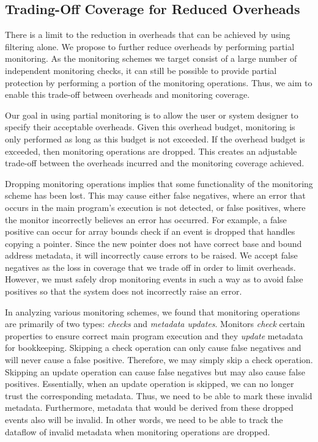 \subsection{Trading-Off Coverage for Reduced Overheads}
\label{sec:optimizations.drop}

There is a limit to the reduction in overheads that can be achieved by using
filtering alone. We propose to further reduce overheads
by performing partial monitoring. As the
monitoring schemes we target consist of a large number of independent
monitoring checks, it can still be possible to provide partial protection by
performing a portion of the monitoring operations. Thus, we aim to enable this
trade-off between overheads and monitoring coverage.

Our goal in using partial monitoring is to allow the user or system designer to
specify their acceptable overheads. Given this overhead budget, monitoring is
only performed as long as this budget is not exceeded. If the overhead budget
is exceeded, then monitoring operations are dropped. This creates an adjustable
trade-off between the overheads incurred and the monitoring coverage achieved.

Dropping monitoring operations implies that some functionality of the
monitoring scheme has been lost.  This may cause either false negatives, where
an error that occurs in the main program's execution is not detected, or false
positives, where the monitor incorrectly believes an error has occurred.  For
example, a false positive can occur for array bounds check if an event is
dropped that handles copying a pointer. Since the new pointer does not have
correct base and bound address metadata, it will incorrectly cause errors to be
raised.  We accept false negatives as the
loss in coverage that we trade off in order to limit overheads.  However, we
must safely drop monitoring events in such a way as to avoid false positives so
that the system does not incorrectly raise an error.

In analyzing various monitoring schemes, we found that monitoring operations
are primarily of two types: \emph{checks} and \emph{metadata updates}. Monitors
\emph{check} certain properties to ensure correct main program execution and
they \emph{update} metadata for bookkeeping. Skipping a check operation can
only cause false negatives and will never cause a false positive. Therefore, we
may simply skip a check operation. Skipping an update operation can cause false
negatives but may also cause false positives. Essentially, when an update
operation is skipped, we can no longer trust the corresponding metadata. Thus,
we need to be able to mark these invalid metadata. Furthermore, metadata that
would be derived from these dropped events also will be invalid. In other
words, we need to be able to track the dataflow of invalid metadata when
monitoring operations are dropped.
